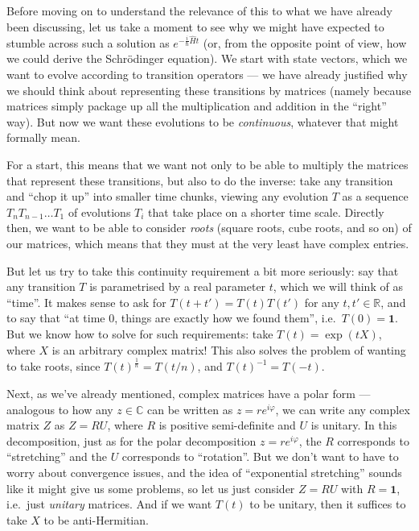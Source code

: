\documentclass[fleqn,a4paper]{article}
\theoremstyle{definition}
\theoremstyle{definition}
\theoremstyle{definition}
\theoremstyle{definition}
\theoremstyle{remark}
\begin{document}
Before moving on to understand the relevance of this to what we have already been discussing, let us take a moment to see why we might have expected to stumble across such a solution as \(e^{-\frac{i}{\hbar}\hat{H}t}\) (or, from the opposite point of view, how we could derive the Schrödinger equation).
We start with state vectors, which we want to evolve according to transition operators --- we have already justified why we should think about representing these transitions by matrices (namely because matrices simply package up all the multiplication and addition in the ``right'' way).
But now we want these evolutions to be \emph{continuous}, whatever that might formally mean.

For a start, this means that we want not only to be able to multiply the matrices that represent these transitions, but also to do the inverse: take any transition and ``chop it up'' into smaller time chunks, viewing any evolution \(T\) as a sequence \(T_nT_{n-1}\ldots T_1\) of evolutions \(T_i\) that take place on a shorter time scale.
Directly then, we want to be able to consider \emph{roots} (square roots, cube roots, and so on) of our matrices, which means that they must at the very least have complex entries.

But let us try to take this continuity requirement a bit more seriously: say that any transition \(T\) is parametrised by a real parameter \(t\), which we will think of as ``time''.
It makes sense to ask for \(T(t+t')=T(t)T(t')\) for any \(t,t'\in\mathbb{R}\), and to say that ``at time \(0\), things are exactly how we found them'', i.e.~\(T(0)=\mathbf{1}\).
But we know how to solve for such requirements: take \(T(t)=\exp(tX)\), where \(X\) is an arbitrary complex matrix!
This also solves the problem of wanting to take roots, since \(T(t)^{\frac{1}{n}}=T(t/n)\), and \(T(t)^{-1}=T(-t)\).

Next, as we've already mentioned, complex matrices have a polar form --- analogous to how any \(z\in\mathbb{C}\) can be written as \(z=re^{i\varphi}\), we can write any complex matrix \(Z\) as \(Z=RU\), where \(R\) is positive semi-definite and \(U\) is unitary.
In this decomposition, just as for the polar decomposition \(z=re^{i\varphi}\), the \(R\) corresponds to ``stretching'' and the \(U\) corresponds to ``rotation''.
But we don't want to have to worry about convergence issues, and the idea of ``exponential stretching'' sounds like it might give us some problems, so let us just consider \(Z=RU\) with \(R=\mathbf{1}\), i.e.~just \emph{unitary} matrices.
And if we want \(T(t)\) to be unitary, then it suffices to take \(X\) to be anti-Hermitian.
\end{document}
